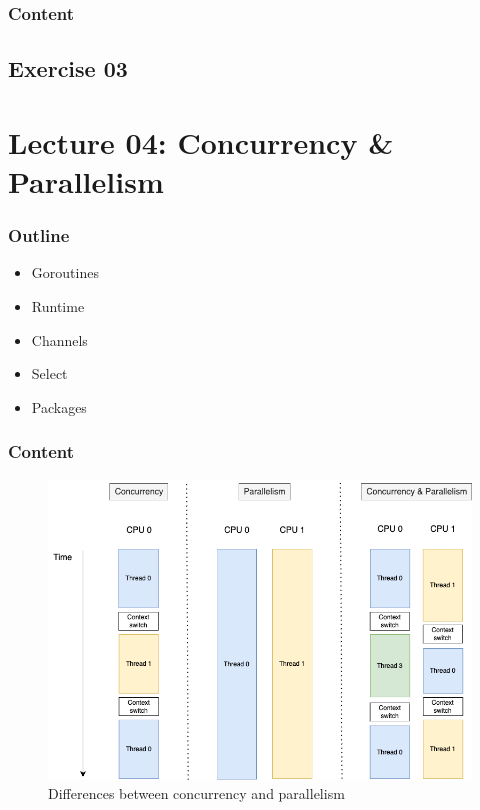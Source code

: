 \documentclass[
  digital,
  color,
  oneside,
  nosansbold,
  nocolorbold,
  lof,
  nolot,
]{fithesis4}
\begin{document}
\subsubsection{Content}

\subsection{Exercise 03}

\section{Lecture 04: Concurrency \& Parallelism}

\subsubsection{Outline}

\begin{itemize}
    \item Goroutines
    \item Runtime
    \item Channels
    \item Select
    \item Packages
\end{itemize}

\subsubsection{Content}

\begin{figure}[H]
    \centering
    \includegraphics[width=12cm]{figures/concurrency-parallelism.png}
    \caption{Differences between concurrency and parallelism}
\end{figure}
\end{document}
